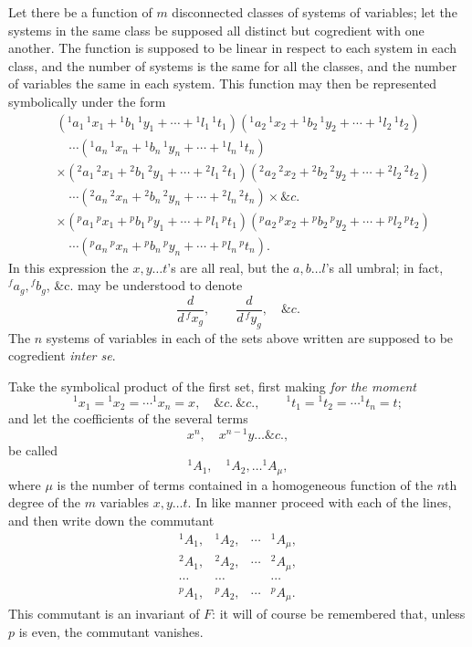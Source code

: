 \documentclass[11pt]{article}
\begin{document}
{{Let there be a function of $m$ disconnected classes of systems of variables; let the systems in the same class be supposed all distinct but cogredient with one another. The function is supposed to be linear in respect to each system in each class, and the number of systems is the same for all the classes, and the number of variables the same in each system. This function may then be represented symbolically under the form
\[
\begin{aligned}
&({}^{1}a_1\,{}^{1}x_1+{}^{1}b_1\,{}^{1}y_1+\cdots+{}^{1}l_1\,{}^{1}t_1)
({}^{1}a_2\,{}^{1}x_2+{}^{1}b_2\,{}^{1}y_2+\cdots+{}^{1}l_2\,{}^{1}t_2)\\
&\quad\cdots({}^{1}a_n\,{}^{1}x_n+{}^{1}b_n\,{}^{1}y_n+\cdots+{}^{1}l_n\,{}^{1}t_n)\\
&\times({}^{2}a_1\,{}^{2}x_1+{}^{2}b_1\,{}^{2}y_1+\cdots+{}^{2}l_1\,{}^{2}t_1)
({}^{2}a_2\,{}^{2}x_2+{}^{2}b_2\,{}^{2}y_2+\cdots+{}^{2}l_2\,{}^{2}t_2)\\
&\quad\cdots({}^{2}a_n\,{}^{2}x_n+{}^{2}b_n\,{}^{2}y_n+\cdots+{}^{2}l_n\,{}^{2}t_n)\times\&c.\\
&\times({}^{p}a_1\,{}^{p}x_1+{}^{p}b_1\,{}^{p}y_1+\cdots+{}^{p}l_1\,{}^{p}t_1)
({}^{p}a_2\,{}^{p}x_2+{}^{p}b_2\,{}^{p}y_2+\cdots+{}^{p}l_2\,{}^{p}t_2)\\
&\quad\cdots({}^{p}a_n\,{}^{p}x_n+{}^{p}b_n\,{}^{p}y_n+\cdots+{}^{p}l_n\,{}^{p}t_n).
\end{aligned}
\]
In this expression the $x,y\ldots t$'s are all real, but the $a,b\ldots l$'s all umbral; in fact, ${}^{f}a_g,{}^{f}b_g$, \&c. may be understood to denote
\[
\frac{d}{d\,{}^{f}x_g},\qquad \frac{d}{d\,{}^{f}y_g},\quad \&c.
\]
The $n$ systems of variables in each of the sets above written are supposed to be cogredient \emph{inter se}.

Take the symbolical product of the first set, first making \emph{for the moment}
\[
{}^{1}x_1={}^{1}x_2=\cdots{}^{1}x_n=x,\quad \&c.\ \&c.,\qquad
{}^{1}t_1={}^{1}t_2=\cdots{}^{1}t_n=t;
\]
and let the coefficients of the several terms
\[
x^n,\quad x^{n-1}y\ldots \&c.,
\]
be called
\[
{}^{1}A_1,\quad {}^{1}A_2,\ldots{}^{1}A_\mu,
\]
where $\mu$ is the number of terms contained in a homogeneous function of the $n$th degree of the $m$ variables $x,y\ldots t$. In like manner proceed with each of the lines, and then write down the commutant
\[
\begin{array}{cccc}
{}^{1}A_1,&{}^{1}A_2,&\cdots&{}^{1}A_\mu,\\
{}^{2}A_1,&{}^{2}A_2,&\cdots&{}^{2}A_\mu,\\
\cdots&\cdots&&\cdots\\
{}^{p}A_1,&{}^{p}A_2,&\cdots&{}^{p}A_\mu.
\end{array}
\]
This commutant is an invariant of $F$: it will of course be remembered that, unless $p$ is even, the commutant vanishes.

}}
\end{document}
